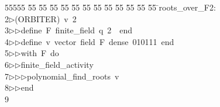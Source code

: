 %
%
\begin{tabbing}
55555 \= 55 \= 55 \= 55 \= 55 \= 55 \= 55 \= 55 \= 55 \= 55 \= 55 \= 55 \= 55 \= \>roots\_over\_F2:\\[0pt]
2\>$\triangleright$\>(ORBITER)\ v\ 2\ \\[0pt]
3\>$\triangleright$\>$\triangleright$\>define\ F\ finite\_field\ q\ 2\ \ end\ \\[0pt]
4\>$\triangleright$\>$\triangleright$\>define\ v\ vector\ field\ F\ dense\ 010111\ end\ \\[0pt]
5\>$\triangleright$\>$\triangleright$\>with\ F\ do\ \\[0pt]
6\>$\triangleright$\>$\triangleright$\>finite\_field\_activity\ \\[0pt]
7\>$\triangleright$\>$\triangleright$\>$\triangleright$\>polynomial\_find\_roots\ v\ \\[0pt]
8\>$\triangleright$\>$\triangleright$\>end\\[0pt]
9\>\end{tabbing}
